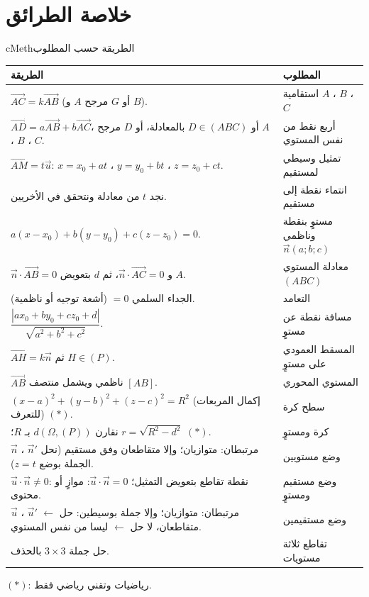 \documentclass[12pt,a4paper]{article}
\newenvironment{BOX}[2]{\begin{otherlanguage}{english}\begin{arbox}{#1}{#2}}{\end{arbox}\end{otherlanguage}}
\newcommand{\V}[1]{\overrightarrow{#1}}
\newcommand{\vu}{\vec{u}}\newcommand{\vv}{\vec{v}}\newcommand{\vw}{\vec{w}}\newcommand{\vn}{\vec{n}}
\begin{document}
\section{خلاصة الطرائق}
\begin{BOX}{cMeth}{الطريقة حسب المطلوب}
\begin{center}
\renewcommand{\arraystretch}{1.3}
\begin{tabular}{|p{}|p{}|}\hline
\rowcolor{cSec!12} \textbf{الطريقة} & \textbf{المطلوب}\\\hline
$\V{AC}=k\V{AB}$ (أو $G$ مرجح $A$ و $B$). & استقامية $A$ ، $B$ ، $C$\\\hline
$\V{AD}=a\V{AB}+b\V{AC}$، أو $D\in(ABC)$ بالمعادلة، أو $D$ مرجح $A$ ، $B$ ، $C$. & أربع نقط من نفس المستوي\\\hline
$\V{AM}=t\vu$: $x=x_0+at$ ، $y=y_0+bt$ ، $z=z_0+ct$. & تمثيل وسيطي لمستقيم\\\hline
نجد $t$ من معادلة ونتحقق في الأخريين. & انتماء نقطة إلى مستقيم\\\hline
$a(x-x_0)+b(y-y_0)+c(z-z_0)=0$. & مستوٍ بنقطة وناظمي $\vn(a;b;c)$\\\hline
$\vn\cdot\V{AB}=0$ و $\vn\cdot\V{AC}=0$، ثم $d$ بتعويض $A$. & معادلة المستوي $(ABC)$\\\hline
الجداء السلمي $=0$ (أشعة توجيه أو ناظمية). & التعامد\\\hline
$\dfrac{|ax_0+by_0+cz_0+d|}{\sqrt{a^{2}+b^{2}+c^{2}}}$. & مسافة نقطة عن مستوٍ\\\hline
$\V{AH}=k\vn$ ثم $H\in(P)$. & المسقط العمودي على مستوٍ\\\hline
$\V{AB}$ ناظمي ويشمل منتصف $[AB]$. & المستوي المحوري\\\hline
$(x-a)^{2}+(y-b)^{2}+(z-c)^{2}=R^{2}$ (إكمال المربعات للتعرف) $(\ast)$. & سطح كرة\\\hline
نقارن $d(\Omega,(P))$ بـ $R$؛ $r=\sqrt{R^{2}-d^{2}}$ $(\ast)$. & كرة ومستوٍ\\\hline
$\vn$ ، $\vn'$ مرتبطان: متوازيان؛ وإلا متقاطعان وفق مستقيم (نحل الجملة بوضع $z=t$). & وضع مستويين\\\hline
$\vu\cdot\vn\neq0$: نقطة تقاطع بتعويض التمثيل؛ $\vu\cdot\vn=0$: موازٍ أو محتوى. & وضع مستقيم ومستوٍ\\\hline
$\vu$ ، $\vu'$ مرتبطان: متوازيان؛ وإلا جملة بوسيطين: حل $\leftarrow$ متقاطعان، لا حل $\leftarrow$ ليسا من نفس المستوي. & وضع مستقيمين\\\hline
حل جملة $3\times3$ بالحذف. & تقاطع ثلاثة مستويات\\\hline
\end{tabular}
\end{center}
$(\ast)$: رياضيات وتقني رياضي فقط.
\end{BOX}
\end{document}
